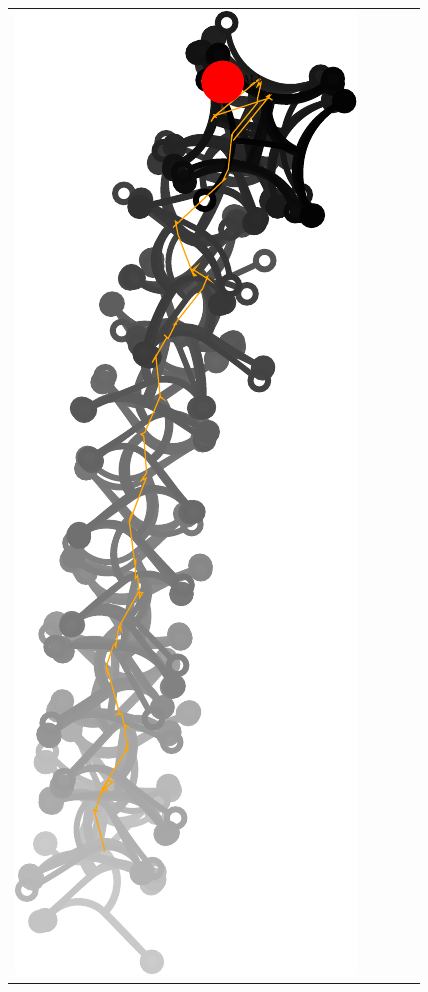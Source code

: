 \documentclass[10pt,a4paper]{article}
\begin{document}
\begin{tabular}{ccccc}
\includegraphics[scale=.5]{pics/pathplanner_with_noise/example_straight_01/gait.pdf}
&

\end{tabular}
\end{document}
